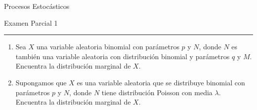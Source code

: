 \documentclass{report}
\begin{document}
\begin{center}
    \textsf{\Large Procesos Estocásticos}
    \par\medskip
    \textsf{\large Examen Parcial 1}
    \end{center}
    \hrule
    \par\bigskip

\begin{enumerate}
%
\item Sea $X$ una variable aleatoria binomial con parámetros $p$ y $N$, donde $N$ es también una variable aleatoria con distribución binomial y parámetros $q$ y $M$. Encuentra la distribución marginal de $X$.
\item Supongamos que $X$ es una variable aleatoria que se distribuye binomial con parámetros $p$ y $N$, donde $N$ tiene distribución Poisson con media $\lambda$. Encuentra la distribución marginal de $X$. 

\end{enumerate}
\end{document}

